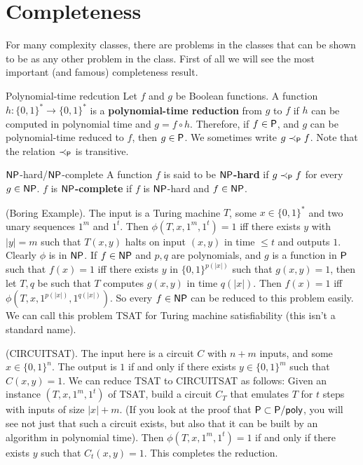 \documentclass{article}
\begin{document}
\section{Completeness}
For many complexity classes, there are problems in the classes that can be shown to be  as any other problem in the class. First of all we will see the most important (and famous) completeness result. \begin{fancydefine}{Polynomial-time redcution}
    Let $f$ and $g$ be Boolean functions. A function $h : \{0,1\}^{*} \to \{0,1\}^{*}$ is a \textbf{polynomial-time reduction} from $g$ to $f$ if $h$ can be computed in polynomial time and $g = f \circ h$. Therefore, if $f \in \mathsf{P}$, and $g$ can be polynomial-time reduced to $f$, then $g \in \mathsf{P}$. We sometimes write $g \prec_{\mathsf{P}} f$. Note that the relation $\prec_{\mathsf{P}}$ is transitive.
\end{fancydefine}
\begin{fancydefine}{$\mathsf{NP}$-hard/$\mathsf{NP}$-complete}
    A function $f$ is said to be $\mathsf{NP}$\textbf{-hard} if $g \prec_{\mathsf{P}} f$ for every $g \in \mathsf{NP}$. $f$ is $\mathsf{NP}$\textbf{-complete} if $f$ is $\mathsf{NP}$-hard and $f \in \mathsf{NP}$.
\end{fancydefine}
\begin{ex*}
    (Boring Example). The input is a Turing machine $T$, some $x \in \{0,1\}^{*}$ and two unary sequences $1^{m}$ and $1^{t}$. Then $\phi(T, x, 1^{m}, 1^{t})=1$ iff there exists $y$ with $|y|=m$ such that $T(x,y)$ halts on input $(x,y)$ in time $\leq t$ and outputs $1$. Clearly $\phi$ is in $\mathsf{NP}$. If $f \in \mathsf{NP}$ and $p,q$ are polynomials, and $g$ is a function in $\mathsf{P}$ such that $f(x)=1$ iff there exists $y$ in $\{0,1\}^{p(|x|)}$ such that $g(x,y)=1$, then let $T,q$ be such that $T$ computes $g(x,y)$ in time $q(|x|)$. Then $f(x)=1$ iff $\phi(T,x,1^{p(|x|)},1^{q(|x|)})$. So every $f \in \mathsf{NP}$ can be reduced to this problem easily. We can call this problem TSAT for Turing machine satisfiability (this isn't a standard name).
\end{ex*}
\begin{ex*}
    (CIRCUITSAT). The input here is a circuit $C$ with $n+m$ inputs, and some $x \in \{0,1\}^{n}$. The output is $1$ if and only if there exists $y \in \{0,1\}^{m}$ such that $C(x,y)=1$. We can reduce TSAT to CIRCUITSAT as follows:\gap 
    Given an instance $(T,x,1^{m},1^{t})$ of TSAT, build a circuit $C_{T}$ that emulates $T$ for $t$ steps with inputs of size $|x|+m$. (If you look at the proof that $\mathsf{P} \subset \mathsf{P/poly}$, you will see not just that such a circuit exists, but also that it can be built by an algorithm in polynomial time). Then $\phi(T,x,1^{m},1^{t})=1$ if and only if there exists $y$ such that $C_{t}(x,y)=1$. This completes the reduction.
\end{ex*}
\end{document}
